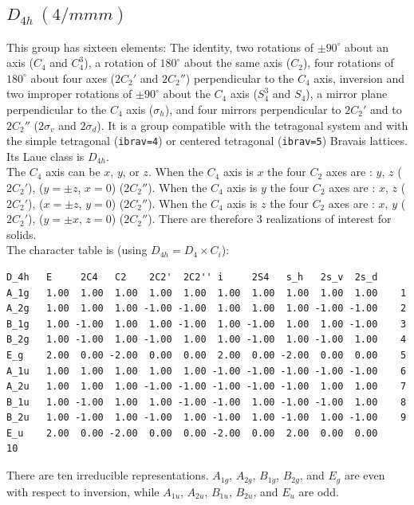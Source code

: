 \documentclass[12pt,a4paper]{article}
\begin{document}
\subsection{\color{web-blue}$D_{4h}\ (4/mmm)$} 
This group has sixteen elements: The identity, two rotations of $\pm90^\circ$
about an axis ($C_4$ and $C_4^3$), a rotation of $180^\circ$ about the 
same axis ($C_2$), four rotations of $180^\circ$ about four axes ($2C_2'$
and $2C_2''$) perpendicular to the $C_4$ axis, inversion and two improper 
rotations of $\pm90^\circ$ about the $C_4$ axis ($S_4^3$ and $S_4$), a 
mirror plane perpendicular to the $C_4$ axis ($\sigma_h$),
and four mirrors perpendicular to $2C_2'$ and to $2C_2''$ 
($2\sigma_v$ and $2\sigma_d$). 
It is a group compatible with the tetragonal system 
and with the simple tetragonal (\texttt{ibrav=4}) or centered tetragonal
(\texttt{ibrav=5}) Bravais lattices. \\
Its Laue class is $D_{4h}$. \\
The $C_4$ axis can be $x$, $y$, or $z$. 
When the $C_4$ axis is $x$ the four $C_2$ axes are : $y$, $z$ ($2C_2'$),
($y=\pm z$, $x=0$) ($2C_2''$).  
When the $C_4$ axis is $y$ the four $C_2$ axes are : $x$, $z$ ($2C_2'$),
($x=\pm z$, $y=0$) ($2C_2''$).  
When the $C_4$ axis is $z$ the four $C_2$ axes are : $x$, $y$ ($2C_2'$),
($y=\pm x$, $z=0$) ($2C_2''$).  
There are therefore $3$ realizations of interest for solids. \\
The character table is (using $D_{4h}=D_4 \times C_i$):
\begin{verbatim}
D_4h   E     2C4   C2    2C2'  2C2'' i     2S4   s_h   2s_v  2s_d 
A_1g   1.00  1.00  1.00  1.00  1.00  1.00  1.00  1.00  1.00  1.00    1
A_2g   1.00  1.00  1.00 -1.00 -1.00  1.00  1.00  1.00 -1.00 -1.00    2
B_1g   1.00 -1.00  1.00  1.00 -1.00  1.00 -1.00  1.00  1.00 -1.00    3
B_2g   1.00 -1.00  1.00 -1.00  1.00  1.00 -1.00  1.00 -1.00  1.00    4
E_g    2.00  0.00 -2.00  0.00  0.00  2.00  0.00 -2.00  0.00  0.00    5
A_1u   1.00  1.00  1.00  1.00  1.00 -1.00 -1.00 -1.00 -1.00 -1.00    6
A_2u   1.00  1.00  1.00 -1.00 -1.00 -1.00 -1.00 -1.00  1.00  1.00    7
B_1u   1.00 -1.00  1.00  1.00 -1.00 -1.00  1.00 -1.00 -1.00  1.00    8
B_2u   1.00 -1.00  1.00 -1.00  1.00 -1.00  1.00 -1.00  1.00 -1.00    9
E_u    2.00  0.00 -2.00  0.00  0.00 -2.00  0.00  2.00  0.00  0.00    10
\end{verbatim}
There are ten irreducible representations. $A_{1g}$, $A_{2g}$, $B_{1g}$, 
$B_{2g}$, and $E_g$ are even with respect to inversion, while 
$A_{1u}$, $A_{2u}$, $B_{1u}$, $B_{2u}$, and $E_u$ are odd.
\end{document}

